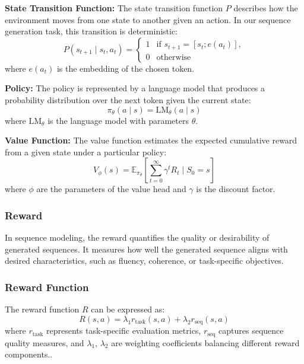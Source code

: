 \textbf{State Transition Function: } 
The state transition function \(P\) describes how the environment moves from one state to another given an action. In our sequence generation task, this transition is deterministic:
\begin{equation} \label{eq:state_trans_func}
    P(s_{t+1} \mid s_t, a_t) = 
    \begin{cases} 
    1 & \text{if } s_{t+1} = [s_t; e(a_t)], \\
    0 & \text{otherwise}
    \end{cases}
\end{equation}
where \(e(a_t)\) is the embedding of the chosen token.

\textbf{Policy: }
The policy is represented by a language model that produces a probability distribution over the next token given the current state:
\begin{equation}
    \pi_\theta(a \mid s) = \text{LM}_\theta(a \mid s)
\end{equation}
where \(\text{LM}_\theta\) is the language model with parameters \(\theta\).

\textbf{Value Function: }
The value function estimates the expected cumulative reward from a given state under a particular policy:
\begin{equation}
    V_\phi(s) = \mathbb{E}_{\pi_\theta}\left[\sum_{t=0}^{\infty} \gamma^t R_t \mid S_0 = s\right]
\end{equation}
where \(\phi\) are the parameters of the value head and \(\gamma\) is the discount factor.

\subsubsection{Reward}
In sequence modeling, the reward quantifies the quality or desirability of generated sequences. It measures how well the generated sequence aligns with desired characteristics, such as fluency, coherence, or task-specific objectives.

\subsubsection*{Reward Function}
The reward function \(R\) can be expressed as:
\begin{equation}
    R(s, a) = \lambda_1 r_{\text{task}}(s, a) + \lambda_2 r_{\text{seq}}(s, a)
\end{equation}
where $r_{\text{task}}$ represents task-specific evaluation metrics, $r_{\text{seq}}$ captures sequence quality measures, and $\lambda_1$, $\lambda_2$ are weighting coefficients balancing different reward components..


